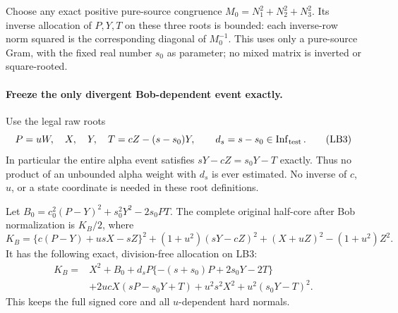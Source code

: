 Choose any exact positive pure-source congruence
$M_0=N_1^2+N_2^2+N_3^2$.  Its inverse allocation of $P,Y,T$
on these three roots is bounded: each inverse-row norm squared is
the corresponding diagonal of $M_0^{-1}$.  This uses only a
pure-source Gram, with the fixed real number $s_0$ as parameter;
no mixed matrix is inverted or square-rooted.

\paragraph{Freeze the only divergent Bob-dependent event exactly.}
Use the legal raw roots
\[
 P=uW,\quad X,\quad Y,\quad
 T=cZ-(s-s_0)Y,
 \qquad d_s=s-s_0\in\operatorname{Inf}_{\rm test}.
                                                               \tag{LB3}
\]
In particular the entire alpha event satisfies
$sY-cZ=s_0Y-T$ exactly.  Thus no product of an unbounded alpha
weight with $d_s$ is ever estimated.  No inverse of $c$, $u$, or
a state coordinate is needed in these root definitions.

Let $B_0=c_0^2(P-Y)^2+s_0^2Y^2-2s_0PT$.
The complete original half-core after Bob normalization is
$K_B/2$, where
\[
 K_B=\{c(P-Y)+usX-sZ\}^2
       +(1+u^2)(sY-cZ)^2+(X+uZ)^2-(1+u^2)Z^2.
\]
It has the following exact, division-free allocation on LB3:
\[
\begin{split}
 K_B={}&X^2+B_0
       +d_sP\{-(s+s_0)P+2s_0Y-2T\}\\
       &+2ucX(sP-s_0Y+T)
       +u^2s^2X^2+u^2(s_0Y-T)^2.
\end{split} \tag{LB4}
\]
This keeps the full signed core and all $u$-dependent hard normals.

